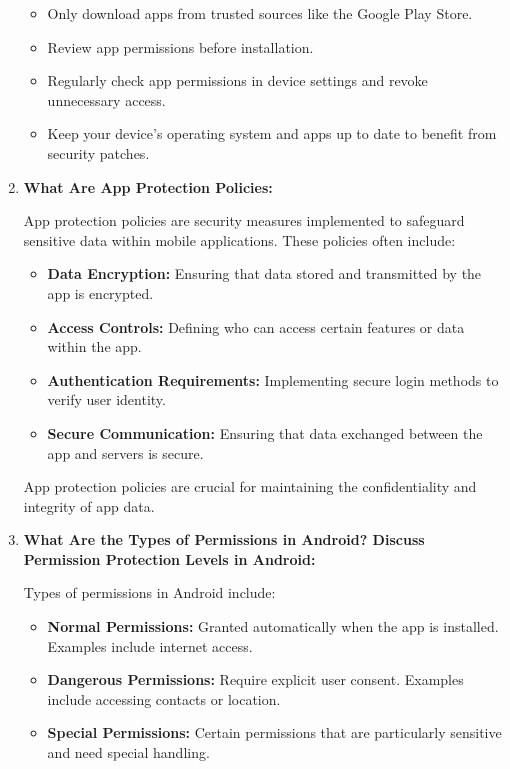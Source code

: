 \documentclass[11pt]{article}
\begin{document}
\begin{enumerate}
          \begin{itemize}
              \item Only download apps from trusted sources like the Google Play Store.
              \item Review app permissions before installation.
              \item Regularly check app permissions in device settings and revoke unnecessary access.
              \item Keep your device's operating system and apps up to date to benefit from security patches.
          \end{itemize}

    \item \textbf{What Are App Protection Policies:}

          App protection policies are security measures implemented to safeguard sensitive data within mobile applications. These policies often include:

          \begin{itemize}
              \item \textbf{Data Encryption:} Ensuring that data stored and transmitted by the app is encrypted.
              \item \textbf{Access Controls:} Defining who can access certain features or data within the app.
              \item \textbf{Authentication Requirements:} Implementing secure login methods to verify user identity.
              \item \textbf{Secure Communication:} Ensuring that data exchanged between the app and servers is secure.
          \end{itemize}

          App protection policies are crucial for maintaining the confidentiality and integrity of app data.

    \item \textbf{What Are the Types of Permissions in Android? Discuss Permission Protection Levels in Android:}

          Types of permissions in Android include:

          \begin{itemize}
              \item \textbf{Normal Permissions:} Granted automatically when the app is installed. Examples include internet access.
              \item \textbf{Dangerous Permissions:} Require explicit user consent. Examples include accessing contacts or location.
              \item \textbf{Special Permissions:} Certain permissions that are particularly sensitive and need special handling.
          \end{itemize}


\end{enumerate}
\end{document}
